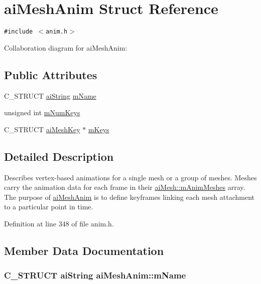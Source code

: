 \hypertarget{structai_mesh_anim}{
\section{aiMeshAnim Struct Reference}
\label{structai_mesh_anim}
}
{\tt \#include $<$anim.h$>$}

Collaboration diagram for aiMeshAnim:\subsection*{Public Attributes}
\begin{CompactItemize}
\item 
C\_\-STRUCT \hyperlink{structai_string}{aiString} \hyperlink{structai_mesh_anim_20751a739377fdba514c676ef4bda4c7}{mName}
\item 
unsigned int \hyperlink{structai_mesh_anim_a8702d42bf619ccc8414a556f41634d8}{mNumKeys}
\item 
C\_\-STRUCT \hyperlink{structai_mesh_key}{aiMeshKey} $\ast$ \hyperlink{structai_mesh_anim_bc78e9f6d7583c541447e8c389488f1b}{mKeys}
\end{CompactItemize}


\subsection{Detailed Description}
Describes vertex-based animations for a single mesh or a group of meshes. Meshes carry the animation data for each frame in their \hyperlink{structai_mesh_5078f7db7e99ed05db89dfa412f0e990}{aiMesh::mAnimMeshes} array. The purpose of \hyperlink{structai_mesh_anim}{aiMeshAnim} is to define keyframes linking each mesh attachment to a particular point in time. 

Definition at line 348 of file anim.h.

\subsection{Member Data Documentation}
\hypertarget{structai_mesh_anim_20751a739377fdba514c676ef4bda4c7}{
\subsubsection[mName]{\setlength{\rightskip}{0pt plus 5cm}C\_\-STRUCT {\bf aiString} {\bf aiMeshAnim::mName}}}
\label{structai_mesh_anim_20751a739377fdba514c676ef4bda4c7}


